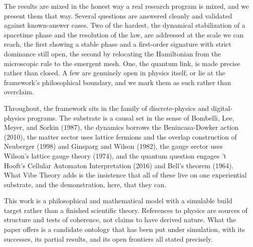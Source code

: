 The results are mixed in the honest way a real research program is mixed, and we present them that way. Several questions are answered cleanly and validated against known-answer cases. Two of the hardest, the dynamical stabilization of a spacetime phase and the resolution of the law, are addressed at the scale we can reach, the first showing a stable phase and a first-order signature with strict dominance still open, the second by relocating the Hamiltonian from the microscopic rule to the emergent mesh. One, the quantum link, is made precise rather than closed. A few are genuinely open in physics itself, or lie at the framework's philosophical boundary, and we mark them as such rather than overclaim.

Throughout, the framework sits in the family of discrete-physics and digital-physics programs. The substrate is a causal set in the sense of Bombelli, Lee, Meyer, and Sorkin (1987), the dynamics borrows the Benincasa-Dowker action (2010), the matter sector uses lattice fermions and the overlap construction of Neuberger (1998) and Ginsparg and Wilson (1982), the gauge sector uses Wilson's lattice gauge theory (1974), and the quantum question engages 't Hooft's Cellular Automaton Interpretation (2016) and Bell's theorem (1964). What Vibe Theory adds is the insistence that all of these live on one experiential substrate, and the demonstration, here, that they can.

This work is a philosophical and mathematical model with a simulable build target rather than a finished scientific theory. References to physics are sources of structure and tests of coherence, not claims to have derived nature. What the paper offers is a candidate ontology that has been put under simulation, with its successes, its partial results, and its open frontiers all stated precisely.
